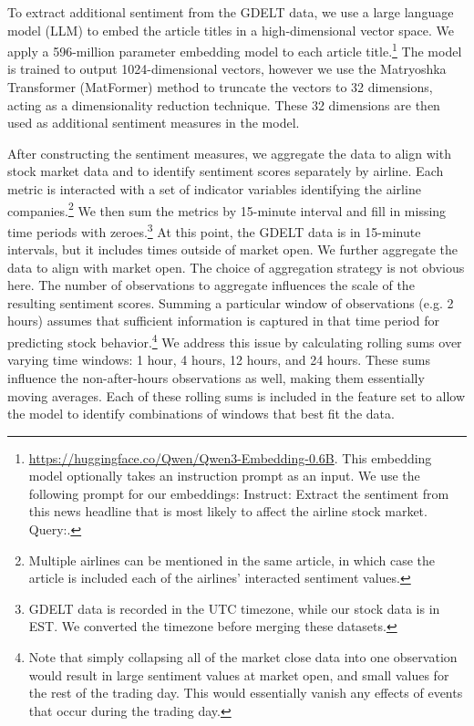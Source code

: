 \documentclass[12pt]{article}
\begin{document}
To extract additional sentiment from the GDELT data, we use a large language model (LLM) to embed the article titles in a high-dimensional vector space. We apply a 596-million parameter embedding model to each article title.\footnote{\url{https://huggingface.co/Qwen/Qwen3-Embedding-0.6B}. This embedding model optionally takes an instruction prompt as an input. We use the following prompt for our embeddings: \textsf{Instruct: Extract the sentiment from this news headline that is most likely to affect the airline stock market. Query:}.} The model is trained to output 1024-dimensional vectors, however we use the Matryoshka Transformer (MatFormer) method to truncate the vectors to 32 dimensions, acting as a dimensionality reduction technique. These 32 dimensions are then used as additional sentiment measures in the model.

After constructing the sentiment measures, we aggregate the data to align with stock market data and to identify sentiment scores separately by airline. Each metric is interacted with a set of indicator variables identifying the airline companies.\footnote{Multiple airlines can be mentioned in the same article, in which case the article is included each of the airlines' interacted sentiment values.} We then sum the metrics by 15-minute interval and fill in missing time periods with zeroes.\footnote{GDELT data is recorded in the UTC timezone, while our stock data is in EST. We converted the timezone before merging these datasets.} At this point, the GDELT data is in 15-minute intervals, but it includes times outside of market open. We further aggregate the data to align with market open. The choice of aggregation strategy is not obvious here. The number of observations to aggregate influences the scale of the resulting sentiment scores. Summing a particular window of observations (e.g. 2 hours) assumes that sufficient information is captured in that time period for predicting stock behavior.\footnote{Note that simply collapsing all of the market close data into one observation would result in large sentiment values at market open, and small values for the rest of the trading day. This would essentially vanish any effects of events that occur during the trading day.} We address this issue by calculating rolling sums over varying time windows: 1 hour, 4 hours, 12 hours, and 24 hours. These sums influence the non-after-hours observations as well, making them essentially moving averages. Each of these rolling sums is included in the feature set to allow the model to identify combinations of windows that best fit the data.
\end{document}
